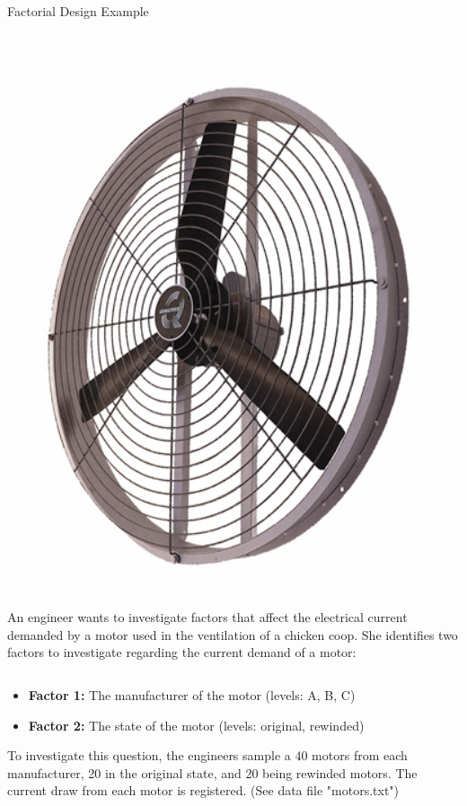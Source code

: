 \begin{frame}{Factorial Design Example}

  \begin{columns}
    \includegraphics[width=1\textwidth]{../img/ventilador.png}
    An engineer wants to investigate factors that affect the electrical current demanded by a motor used in the ventilation of a chicken coop. She identifies two factors to investigate regarding the current demand of a motor:
  \end{columns}
  \begin{itemize}
    \item {\bf Factor 1:} The manufacturer of the motor (levels: A, B, C)
    \item {\bf Factor 2:} The state of the motor (levels: original, rewinded)
  \end{itemize}\bigskip

  To investigate this question, the engineers sample a 40 motors from each manufacturer, 20 in the original state, and 20 being rewinded motors. The current draw from each motor is registered. (See data file "motors.txt")
\end{frame}

